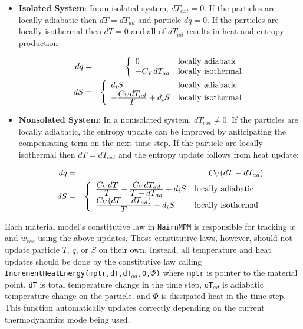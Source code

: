 \documentclass[11pt]{book}
\begin{document}
\begin{itemize}

\item {\bf Isolated System}:
In an isolated system, $dT_{ext}=0$. If the particles are locally adiabatic then $dT=dT_{ad}$ and particle $dq=0$. If the particles are locally isothermal then $dT=0$ and all of $dT_{ad}$ results in heat and entropy production

\begin{eqnarray}
           dq & = & \left\{ \begin{array}{ll}
                0 & {\rm locally\ adiabatic} \\
                -C_VdT_{ad} & {\rm locally\ isothermal}
                \end{array} \right.\\
           dS & = & \left\{ \begin{array}{ll}
                d_iS & {\rm locally\ adiabatic} \\
                -{\displaystyle C_VdT_{ad}\over \displaystyle T} + d_iS & {\rm locally\ isothermal}
                \end{array} \right.
\end{eqnarray}

\item {\bf Nonsolated System}:
In a nonisolated system, $dT_{ext}\ne0$. If the particles are locally adiabatic, the entropy update can be improved by anticipating the compensating term on the next time step. If the particle are locally isothermal then $dT = dT_{ext}$ and the entropy update follows from heat update:

\begin{eqnarray}
           dq & = & C_V (dT - dT_{ad})  \\
           dS & = & \left\{ \begin{array}{ll}
                {\displaystyle C_VdT\over \displaystyle T}-{\displaystyle C_VdT_{ad}\over \displaystyle T+dT_{ad}} + d_iS& {\rm locally\ adiabatic} \\
                {\displaystyle C_V(dT-dT_{ad})\over \displaystyle T} + d_iS& {\rm locally\ isothermal}
                \end{array} \right.
\end{eqnarray}

\end{itemize}

Each material model's constitutive law in {\tt NairnMPM} is responsible for tracking $w$ and $w_{res}$ using the above updates. Those constitutive laws, however, should not update particle $T$, $q$, or $S$ on their own. Instead, all temperature and heat updates should be done by the constitutive law calling {\tt IncrementHeatEnergy(mptr,dT,dT$_{ad}$,0,$\Phi$)} where {\tt mptr} is pointer to the material point, {\tt dT} is total temperature change in the time step, {\tt dT$_{ad}$} is adiabatic temperature change on the particle, and $\Phi$ is dissipated heat in the time step. This function automatically updates correctly depending on the current thermodynamics mode being used.
\end{document}
